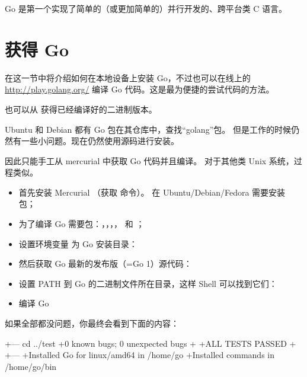 \begin{lbar}[]
Go 是第一个实现了简单的（或更加简单的）并行开发的、跨平台类 C 语言。
\end{lbar}

\section{获得 Go}
在这一节中将介绍如何在本地设备上安装 Go，不过也可以在线上的 \url{http://play.golang.org/} 编译 Go 代码。这是最为便捷的尝试代码的方法。

也可以从 \cite{go_install} 获得已经编译好的二进制版本。

Ubuntu 和 Debian 都有 Go 包在其仓库中，查找``golang''包。
但是工作的时候仍然有一些小问题。现在仍然使用源码进行安装。

因此只能手工从 mercurial 中获取 Go 代码并且编译。
对于其他类 Unix 系统，过程类似。
\begin{itemize}
\item 首先安装 Mercurial （获取  命令）。
在 Ubuntu/Debian/Fedora 需要安装  包；

\item 为了编译 Go 需要包：，，，， 和 ；

\item 设置环境变量  为 Go 安装目录：
\begin{display}
\pr {}
\end{display}

\item 然后获取 Go 最新的发布版（=Go 1）源代码：
\begin{display}
\pr {}
\end{display}

\item 设置 PATH 到 Go 的二进制文件所在目录，这样 Shell 可以找到它们：
\begin{display}
\pr {}
\end{display}

\item 编译 Go
\begin{display}
\pr {}
\pr {}
\end{display}
\end{itemize}
如果全部都没问题，你最终会看到下面的内容：
\begin{display}
+--- cd ../test
+0 known bugs; 0 unexpected bugs
+
+ALL TESTS PASSED
+
+---
+Installed Go for linux/amd64 in /home/go
+Installed commands in /home/go/bin
\end{display}

